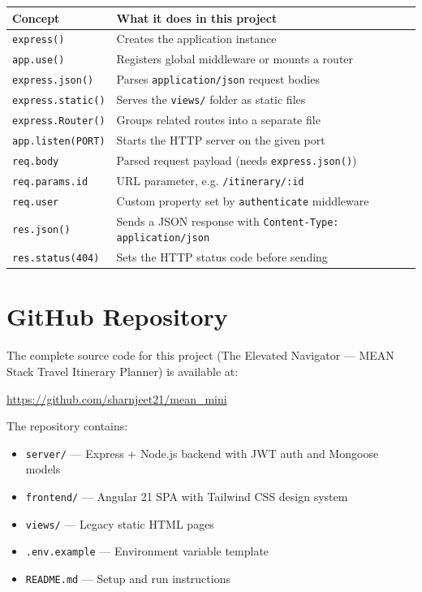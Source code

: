 \documentclass[12pt,a4paper]{article}
\begin{document}
\begin{center}
\begin{tabular}{ll}
\toprule
\textbf{Concept} & \textbf{What it does in this project} \\
\midrule
\texttt{express()}            & Creates the application instance \\
\texttt{app.use()}            & Registers global middleware or mounts a router \\
\texttt{express.json()}       & Parses \texttt{application/json} request bodies \\
\texttt{express.static()}     & Serves the \texttt{views/} folder as static files \\
\texttt{express.Router()}     & Groups related routes into a separate file \\
\texttt{app.listen(PORT)}     & Starts the HTTP server on the given port \\
\texttt{req.body}             & Parsed request payload (needs \texttt{express.json()}) \\
\texttt{req.params.id}        & URL parameter, e.g. \texttt{/itinerary/:id} \\
\texttt{req.user}             & Custom property set by \texttt{authenticate} middleware \\
\texttt{res.json()}           & Sends a JSON response with \texttt{Content-Type: application/json} \\
\texttt{res.status(404)}      & Sets the HTTP status code before sending \\
\bottomrule
\end{tabular}
\end{center}

\newpage

\section*{GitHub Repository}

The complete source code for this project (The Elevated Navigator — MEAN Stack
Travel Itinerary Planner) is available at:

\begin{center}
  \large
  \href{https://github.com/sharnjeet21/mean_mini}{https://github.com/sharnjeet21/mean\_mini}
\end{center}

\vspace{0.5cm}
\noindent The repository contains:
\begin{itemize}
  \item \texttt{server/} — Express + Node.js backend with JWT auth and Mongoose models
  \item \texttt{frontend/} — Angular 21 SPA with Tailwind CSS design system
  \item \texttt{views/} — Legacy static HTML pages
  \item \texttt{.env.example} — Environment variable template
  \item \texttt{README.md} — Setup and run instructions
\end{itemize}
\end{document}
